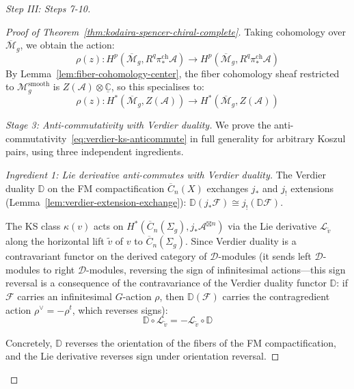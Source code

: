 \begin{proof}[Step III: Steps 7-10]
\begin{proof}[Proof of Theorem~\ref{thm:kodaira-spencer-chiral-complete}]
Taking cohomology over $\overline{\mathcal{M}}_g$, we obtain the action:
\begin{equation}
\rho(z): H^p(\overline{\mathcal{M}}_g, R^q\pi_*^{\mathrm{ch}}\mathcal{A}) \to
H^p(\overline{\mathcal{M}}_g, R^q\pi_*^{\mathrm{ch}}\mathcal{A})
\end{equation}
By Lemma~\ref{lem:fiber-cohomology-center}, the fiber cohomology sheaf restricted to
$\mathcal{M}_g^{\mathrm{smooth}}$ is $Z(\mathcal{A}) \otimes \underline{\mathbb{C}}$,
so this specialises to:
\begin{equation}
\rho(z): H^*(\overline{\mathcal{M}}_g, Z(\mathcal{A})) \to
H^*(\overline{\mathcal{M}}_g, Z(\mathcal{A}))
\end{equation}

\emph{Stage 3: Anti-commutativity with Verdier duality.}
We prove the anti-commutativity~\eqref{eq:verdier-ks-anticommute} in full generality
for arbitrary Koszul pairs, using three independent ingredients.

\emph{Ingredient 1: Lie derivative anti-commutes with Verdier duality.}
The Verdier duality $\mathbb{D}$ on the FM compactification $\overline{C}_n(X)$
exchanges $j_*$ and $j_!$ extensions (Lemma~\ref{lem:verdier-extension-exchange}):
$\mathbb{D}(j_* \mathcal{F}) \cong j_!(\mathbb{D}\mathcal{F})$.

The KS class $\kappa(v)$ acts on $H^*(\overline{C}_n(\Sigma_g), j_*\mathcal{A}^{\boxtimes n})$
via the Lie derivative $\mathcal{L}_{\tilde{v}}$ along the horizontal lift $\tilde{v}$
of $v$ to $\overline{C}_n(\Sigma_g)$.  Since Verdier duality is a contravariant functor
on the derived category of $\mathcal{D}$-modules (it sends left $\mathcal{D}$-modules
to right $\mathcal{D}$-modules, reversing the sign of infinitesimal actions---this
sign reversal is a consequence of the contravariance of the Verdier duality functor
$\mathbb{D}$: if $\mathcal{F}$ carries an infinitesimal $G$-action $\rho$, then
$\mathbb{D}(\mathcal{F})$ carries the contragredient action
$\rho^\vee = -\rho^t$, which reverses signs):
\begin{equation}\label{eq:verdier-lie-anticommute}
\mathbb{D} \circ \mathcal{L}_{\tilde{v}} = -\mathcal{L}_{\tilde{v}} \circ \mathbb{D}
\end{equation}

Concretely, $\mathbb{D}$ reverses the orientation of the fibers of the FM
compactification, and the Lie derivative reverses sign under orientation reversal.


\end{proof}
\end{proof}
